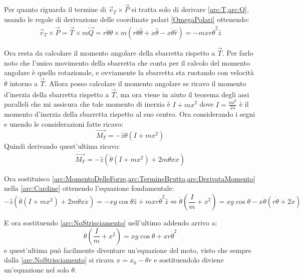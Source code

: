 \documentclass[../main.tex]{subfiles}
\begin{document}
Per quanto riguarda il termine di $\vec v_T\times \vec P$ si tratta solo di derivare \cref{arc:T,arc:Q}, usando le regole di derivazione delle coordinate polari \cref{OmegaPolari} ottenendo:
\begin{equation}\label{arc:TermineBrutto}
	\vec v_T\times \vec P = \dot{\vec{T}}\times m\dot{\vec{Q}}=
	r\dot{\theta}\hat{\theta}\times m\left(r\dot{\theta}\hat{\theta}+\dot x\hat{\theta}-x\dot{\theta}\hat r\right)=
	-mxr\dot{\theta}^2 \hat z
\end{equation}

Ora resta da calcolare il momento angolare della sbarretta rispetto a $\vec T$. Per farlo noto che l'unico movimento della sbarretta che conta per il calcolo del momento angolare è quello rotazionale, e ovviamente la sbarretta sta ruotando con velocità $\dot{\theta}$ intorno a $\vec T$. Allora posso calcolare il momento angolare se ricavo il momento d'inerzia della sbarretta rispetto a $\vec T$, ma ora viene in aiuto il teorema degli assi paralleli che mi assicura che tale momento di inerzia è $I+mx^2$ dove $I=\frac{ml^2}{24}$ è il momento d'inerzia della sbarretta rispetto al suo centro.
Ora considerando i segni e unendo le considerazioni fatte ricavo:
\begin{equation*}
	\overrightarrow{M_T}=-\hat z\dot{\theta}\left(I+mx^2\right)
\end{equation*}
Quindi derivando quest'ultima ricavo:
\begin{equation}\label{arc:DerivataMomento}
	\dot{\overrightarrow{M_T}}=-\hat z\left( \ddot{\theta}\left(I+mx^2\right)+2m\dot{\theta}x\dot x\right)
\end{equation}

Ora sostituisco \cref{arc:MomentoDelleForze,arc:TermineBrutto,arc:DerivataMomento} nella \cref{arc:Cardine} ottenendo l'equazione fondamentale:
\begin{equation*}
	-\hat z\left( \ddot{\theta}\left(I+mx^2\right)+2m\dot{\theta}x\dot x\right)=
	-xg\cos\theta\hat z + mxr\dot{\theta}^2 \hat z \iff 
	\ddot{\theta}\left(\frac Im+x^2\right)=xg\cos\theta-x\dot{\theta}(r\dot{\theta}+2\dot x)
\end{equation*}

E ora sostituendo \cref{arc:NoStrisciamento} nell'ultimo addendo arrivo a:
\begin{equation}\label{arc:Fondamentale}
	\ddot{\theta}\left(\frac Im+x^2\right)=xg\cos\theta+xr\dot{\theta}^2
\end{equation}
e quest'ultima può facilmente diventare un'equazione del moto, visto che sempre dalla \cref{arc:NoStrisciamento} si ricava $x=x_0-\theta r$ e sostituendolo diviene un'equazione nel solo $\theta$.
\end{document}
